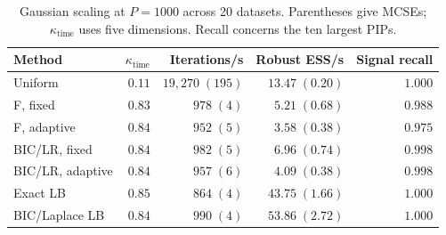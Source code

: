 \begin{table}[t]
\centering
\caption{Gaussian scaling at $P=1000$ across 20 datasets. Parentheses give MCSEs; $\kappa_{\mathrm{time}}$ uses five dimensions. Recall concerns the ten largest PIPs.}
\label{tab:highdim_scaling}
\fontsize{12}{9}\selectfont
\begin{tabular}{lrrrr}
\toprule
Method & $\kappa_{\mathrm{time}}$ & Iterations/s & Robust ESS/s & Signal recall \\
\midrule
Uniform & $0.11$ & $19{,}270\;(195)$ & $13.47\;(0.20)$ & $1.000$ \\
F, fixed & $0.83$ & $978\;(4)$ & $5.21\;(0.68)$ & $0.988$ \\
F, adaptive & $0.84$ & $952\;(5)$ & $3.58\;(0.38)$ & $0.975$ \\
BIC/LR, fixed & $0.84$ & $982\;(5)$ & $6.96\;(0.74)$ & $0.998$ \\
BIC/LR, adaptive & $0.84$ & $957\;(6)$ & $4.09\;(0.38)$ & $0.998$ \\
Exact LB & $0.85$ & $864\;(4)$ & $43.75\;(1.66)$ & $1.000$ \\
BIC/Laplace LB & $0.84$ & $990\;(4)$ & $53.86\;(2.72)$ & $1.000$ \\
\bottomrule
\end{tabular}
\end{table}
